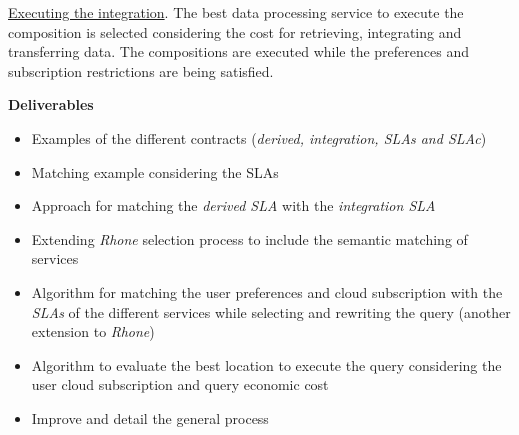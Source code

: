 \documentclass[10pt,a4paper,final]{report}
\begin{document}
\noindent \underline{Executing the integration}. The best data processing service to execute the composition is selected considering the cost for retrieving, integrating and transferring data. The compositions are executed while the preferences and subscription restrictions are being satisfied.
\bigskip

\noindent \textbf{Deliverables}
\begin{itemize}
\item Examples of the different contracts (\textsl{derived, integration, SLAs and SLAc})
\item Matching example considering the SLAs
\item Approach for matching the \textsl{derived SLA} with the \textsl{integration SLA}
\item Extending \textsl{Rhone} selection process to include the semantic matching of services 
\item Algorithm for matching the user preferences and cloud subscription with the \textsl{SLAs} of the different services while selecting and rewriting the query (another extension to \textsl{Rhone})
\item Algorithm to evaluate the best location to execute the query considering the user cloud subscription and query economic cost
\item Improve and detail the general process
\end{itemize}
\end{document}
